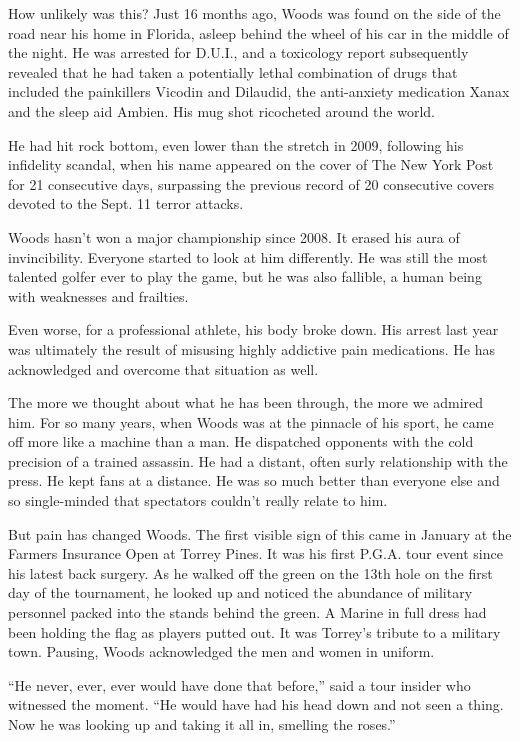 How unlikely was this? Just 16 months ago, Woods was found on the side
of the road near his home in Florida, asleep behind the wheel of his car
in the middle of the night. He was arrested for D.U.I., and a toxicology
report subsequently revealed that he had taken a potentially lethal
combination of drugs that included the painkillers Vicodin and Dilaudid,
the anti-anxiety medication Xanax and the sleep aid Ambien. His mug shot
ricocheted around the world.

He had hit rock bottom, even lower than the stretch in 2009, following
his infidelity scandal, when his name appeared on the cover of The New
York Post for 21 consecutive days, surpassing the previous record of 20
consecutive covers devoted to the Sept. 11 terror attacks.

Woods hasn't won a major championship since 2008. It erased his aura of
invincibility. Everyone started to look at him differently. He was still
the most talented golfer ever to play the game, but he was also
fallible, a human being with weaknesses and frailties.

Even worse, for a professional athlete, his body broke down. His arrest
last year was ultimately the result of misusing highly addictive pain
medications. He has acknowledged and overcome that situation as well.

The more we thought about what he has been through, the more we admired
him. For so many years, when Woods was at the pinnacle of his sport, he
came off more like a machine than a man. He dispatched opponents with
the cold precision of a trained assassin. He had a distant, often surly
relationship with the press. He kept fans at a distance. He was so much
better than everyone else and so single-minded that spectators couldn't
really relate to him.

But pain has changed Woods. The first visible sign of this came in
January at the Farmers Insurance Open at Torrey Pines. It was his first
P.G.A. tour event since his latest back surgery. As he walked off the
green on the 13th hole on the first day of the tournament, he looked up
and noticed the abundance of military personnel packed into the stands
behind the green. A Marine in full dress had been holding the flag as
players putted out. It was Torrey's tribute to a military town. Pausing,
Woods acknowledged the men and women in uniform.

``He never, ever, ever would have done that before,'' said a tour
insider who witnessed the moment. ``He would have had his head down and
not seen a thing. Now he was looking up and taking it all in, smelling
the roses.''

